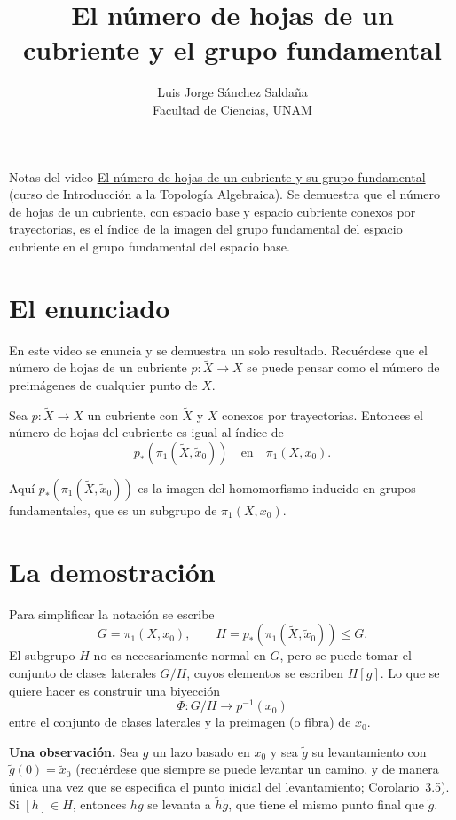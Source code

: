 \documentclass[11pt]{article}
\title{El número de hojas de un cubriente y el grupo fundamental}
\author{Luis Jorge Sánchez Saldaña\\[2pt]\small Facultad de Ciencias, UNAM}
\date{}
\begin{document}
\maketitle

\noindent\small Notas del video
\href{https://www.youtube.com/watch?v=9VcsyAgSIjc}{\guillemotleft{}El número de hojas de un cubriente y su grupo fundamental\guillemotright{}}
(curso de Introducción a la Topología Algebraica). Se demuestra que el número de hojas de un cubriente, con espacio base y espacio cubriente conexos por trayectorias, es el índice de la imagen del grupo fundamental del espacio cubriente en el grupo fundamental del espacio base.
\normalsize

\section*{El enunciado}

En este video se enuncia y se demuestra un solo resultado. Recuérdese que el número de hojas de un cubriente $p\colon\tilde X\to X$ se puede pensar como el número de preimágenes de cualquier punto de $X$.

\begin{prop}\label{prop:hojas-indice}
Sea $p\colon\tilde X\to X$ un cubriente con $\tilde X$ y $X$ conexos por trayectorias. Entonces el número de hojas del cubriente es igual al índice de
\[
  p_*(\pi_1(\tilde X,\tilde x_0))\quad\text{en}\quad\pi_1(X,x_0).
\]
\end{prop}

Aquí $p_*(\pi_1(\tilde X,\tilde x_0))$ es la imagen del homomorfismo inducido en grupos fundamentales, que es un subgrupo de $\pi_1(X,x_0)$.

\section*{La demostración}

Para simplificar la notación se escribe
\[
  G=\pi_1(X,x_0),\qquad H=p_*(\pi_1(\tilde X,\tilde x_0))\le G .
\]
El subgrupo $H$ no es necesariamente normal en $G$, pero se puede tomar el conjunto de clases laterales $G/H$, cuyos elementos se escriben $H[g]$. Lo que se quiere hacer es construir una biyección
\[
  \Phi\colon G/H\to p^{-1}(x_0)
\]
entre el conjunto de clases laterales y la preimagen (o fibra) de $x_0$.

\medskip\noindent\textbf{Una observación.} Sea $g$ un lazo basado en $x_0$ y sea $\tilde g$ su levantamiento con $\tilde g(0)=\tilde x_0$ (recuérdese que siempre se puede levantar un camino, y de manera única una vez que se especifica el punto inicial del levantamiento; Corolario~3.5). Si $[h]\in H$, entonces $hg$ se levanta a $\tilde h\tilde g$, que tiene el mismo punto final que $\tilde g$.
\end{document}

